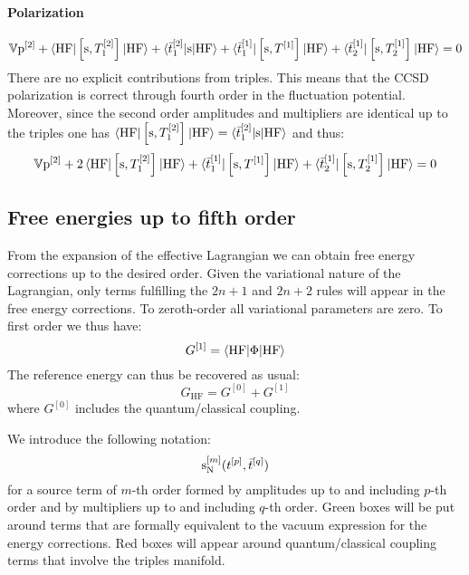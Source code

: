 \paragraph*{Polarization}
\begin{equation}
  \mathbb{V}\mathrm{p}^{[2]} +
  \braket{\mathrm{HF} | \left[ \mathrm{s}, T_1^{[2]} \right]^{}| \mathrm{HF}}
  + \braket{\bar{t}_{1}^{[2]} | \mathrm{s} | \mathrm{HF} }
  + \braket{\bar{t}_{1}^{[1]} | \left[ \mathrm{s}, T^{[1]} \right]^{} | \mathrm{HF}}
  + \braket{\bar{t}_{2}^{[1]} | \left[ \mathrm{s}, T_2^{[1]} \right]^{} | \mathrm{HF}}
  = 0
\end{equation}
There are no explicit contributions from triples. This means that the
\acs{CCSD} polarization is correct through fourth order in the
fluctuation potential.
Moreover, since the second order amplitudes and multipliers are
identical up to the triples one has $\braket{\mathrm{HF} | \left[ \mathrm{s}, T_1^{[2]} \right]^{}| \mathrm{HF}} = \braket{\bar{t}_{1}^{[2]} | \mathrm{s} | \mathrm{HF} }$
and thus:
\begin{equation}\label{eq:2nd-order-pol}
  \mathbb{V}\mathrm{p}^{[2]} +
  2\braket{\mathrm{HF} | \left[ \mathrm{s}, T_1^{[2]} \right]^{}| \mathrm{HF}}
  + \braket{\bar{t}_{1}^{[1]} | \left[ \mathrm{s}, T^{[1]} \right]^{} | \mathrm{HF}}
  + \braket{\bar{t}_{2}^{[1]} | \left[ \mathrm{s}, T_2^{[1]} \right]^{} | \mathrm{HF}}
  = 0
\end{equation}

\subsection{Free energies up to fifth order}\label{sec:energies-pt}

From the expansion of the effective Lagrangian we can obtain free energy
corrections up to the desired order. Given the variational nature of the
Lagrangian, only terms fulfilling the $2n+1$ and $2n+2$ rules will
appear in the free energy corrections.
To zeroth-order all variational parameters are zero. To first order we
thus have:
\begin{equation}\label{eq:first-order-G}
  G^{[1]} = \braket{\mathrm{HF} | \Phi | \mathrm{HF}}
\end{equation}
The reference energy can thus be recovered as usual:
\begin{equation}
  G_\mathrm{HF} = G^{[0]} + G^{[1]}
\end{equation}
where $G^{[0]}$ includes the quantum/classical coupling.

We introduce the following notation:
\begin{equation}
  \mathrm{s}_{\mathrm{N}}^{[m]}(t_{}^{[p]}, \bar{t}_{}^{[q]})
\end{equation}
for a source term of $m$-th order formed by amplitudes up to and
including $p$-th order and by multipliers up to and including $q$-th order.
Green boxes will be put around terms that are formally equivalent to the
vacuum expression for the energy corrections. Red boxes will appear
around quantum/classical coupling terms that involve the triples
manifold.


